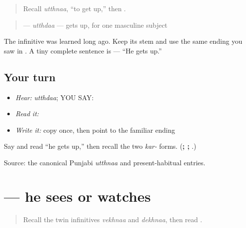 \label{lesson:PA-C183-utthda}



\begin{quote}
Recall \emph{utthnaa}, “to get up,” then \textbf{}.
\end{quote}

\begin{grammarlens}[title={Grammar Lens: move the same ending}]
\begin{quote}
\textbf{} — \emph{utthdaa} — gets up, for one masculine subject
\end{quote}

The infinitive was learned long ago. Keep its stem and use the same ending you saw in \textbf{}. A tiny complete sentence is \textbf{  } — “He gets up.”
\end{grammarlens}

\subsection*{Your turn}
\begin{itemize}
\raggedright
  \item \emph{Hear:} \emph{utthdaa}; YOU SAY: \textbf{}
  \item \emph{Read it:} \textbf{}
  \item \emph{Write it:} copy \textbf{} once, then point to the familiar \textbf{} ending
\end{itemize}

\begin{tcolorbox}[breakable,colback=teal!4,colframe=teal!35!black,title={Before you move on}]
Say and read “he gets up,” then recall the two \emph{kar-} forms. (\textbf{; ; }.)

Source: the canonical Punjabi \emph{utthnaa} and present-habitual entries.
\end{tcolorbox}
\section[\texorpdfstring{\pa{ਦੇਖਦਾ} (dekhdaa)}{ਦੇਖਦਾ (dekhdaa)}]{ — he sees or watches}

\label{lesson:PA-C183-dekhda}



\begin{quote}
Recall the twin infinitives \emph{vekhnaa} and \emph{dekhnaa}, then read \textbf{}.
\end{quote}

